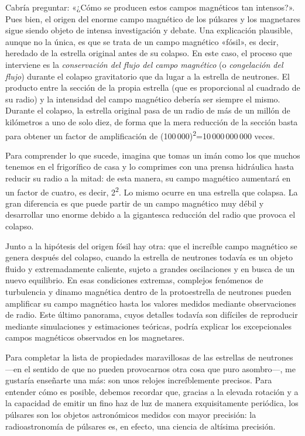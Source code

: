 Cabría preguntar: «¿Cómo se producen estos campos magnéticos tan intensos?». Pues bien, el origen del enorme campo magnético de los púlsares y los magnetares sigue siendo objeto de intensa investigación y debate. Una explicación plausible, aunque no la única, es que se trata de un campo magnético «fósil», es decir, heredado de la estrella original antes de su colapso. En este caso, el proceso que interviene es la \emph{conservación del flujo del campo magnético} (o \emph{congelación del flujo}) durante el colapso gravitatorio que da lugar a la estrella de neutrones. El producto entre la sección de la propia estrella (que es proporcional al cuadrado de su radio) y la intensidad del campo magnético debería ser siempre el mismo. Durante el colapso, la estrella original pasa de un radio de más de un millón de kilómetros a uno de solo diez, de forma que la mera reducción de la sección basta para obtener un factor de amplificación de (100\,000)\textsuperscript{2}=10\,000\,000\,000 veces.

Para comprender lo que sucede, imagina que tomas un imán como los que muchos tenemos en el frigorífico de casa y lo comprimes con una prensa hidráulica hasta reducir su radio a la mitad: de esta manera, su campo magnético aumentará en un factor de cuatro, es decir, 2\textsuperscript{2}. Lo mismo ocurre en una estrella que colapsa. La gran diferencia es que puede partir de un campo magnético muy débil y desarrollar uno enorme debido a la gigantesca reducción del radio que provoca el colapso.

Junto a la hipótesis del origen fósil hay otra: que el increíble campo magnético se genera después del colapso, cuando la estrella de neutrones todavía es un objeto fluido y extremadamente caliente, sujeto a grandes oscilaciones y en busca de un nuevo equilibrio. En esas condiciones extremas, complejos fenómenos de turbulencia y dinamo magnética dentro de la protoestrella de neutrones pueden amplificar su campo magnético hasta los valores medidos mediante observaciones de radio. Este último panorama, cuyos detalles todavía son difíciles de reproducir mediante simulaciones y estimaciones teóricas, podría explicar los excepcionales campos magnéticos observados en los magnetares.

Para completar la lista de propiedades maravillosas de las estrellas de neutrones ---en el sentido de que no pueden provocarnos otra cosa que puro asombro---, me gustaría enseñarte una más: son unos relojes increíblemente precisos. Para entender cómo es posible, debemos recordar que, gracias a la elevada rotación y a la capacidad de emitir un fino haz de luz de manera exquisitamente periódica, los púlsares son los objetos astronómicos medidos con mayor precisión: la radioastronomía de púlsares es, en efecto, una ciencia de altísima precisión.

